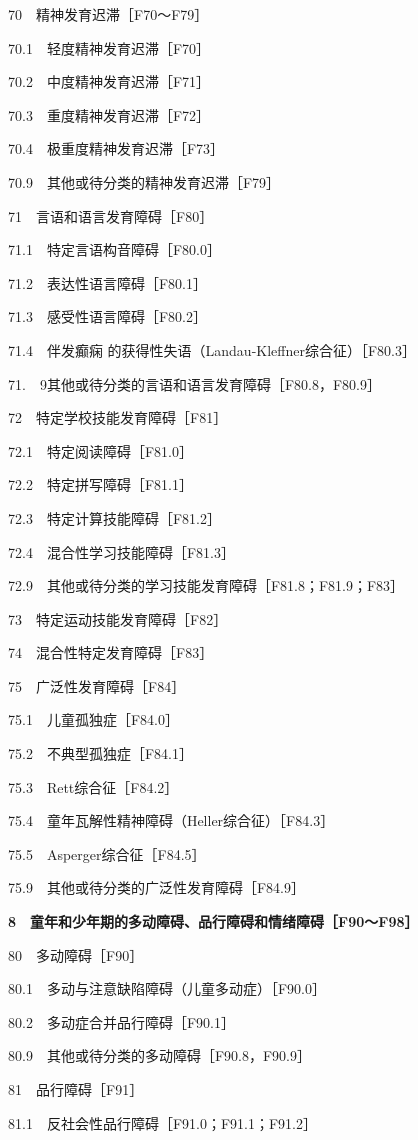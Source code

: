 70　精神发育迟滞［F70～F79］

70.1　轻度精神发育迟滞［F70］

70.2　中度精神发育迟滞［F71］

70.3　重度精神发育迟滞［F72］

70.4　极重度精神发育迟滞［F73］

70.9　其他或待分类的精神发育迟滞［F79］

71　言语和语言发育障碍［F80］

71.1　特定言语构音障碍［F80.0］

71.2　表达性语言障碍［F80.1］

71.3　感受性语言障碍［F80.2］

71.4　伴发癫痫
的获得性失语（Landau-Kleffner综合征）［F80.3］

71.　9其他或待分类的言语和语言发育障碍［F80.8，F80.9］

72　特定学校技能发育障碍［F81］

72.1　特定阅读障碍［F81.0］

72.2　特定拼写障碍［F81.1］

72.3　特定计算技能障碍［F81.2］

72.4　混合性学习技能障碍［F81.3］

72.9　其他或待分类的学习技能发育障碍［F81.8；F81.9；F83］

73　特定运动技能发育障碍［F82］

74　混合性特定发育障碍［F83］

75　广泛性发育障碍［F84］

75.1　儿童孤独症［F84.0］

75.2　不典型孤独症［F84.1］

75.3　Rett综合征［F84.2］

75.4　童年瓦解性精神障碍（Heller综合征）［F84.3］

75.5　Asperger综合征［F84.5］

75.9　其他或待分类的广泛性发育障碍［F84.9］

\textbf{8　童年和少年期的多动障碍、品行障碍和情绪障碍［F90～F98］}

80　多动障碍［F90］

80.1　多动与注意缺陷障碍（儿童多动症）［F90.0］

80.2　多动症合并品行障碍［F90.1］

80.9　其他或待分类的多动障碍［F90.8，F90.9］

81　品行障碍［F91］

81.1　反社会性品行障碍［F91.0；F91.1；F91.2］

